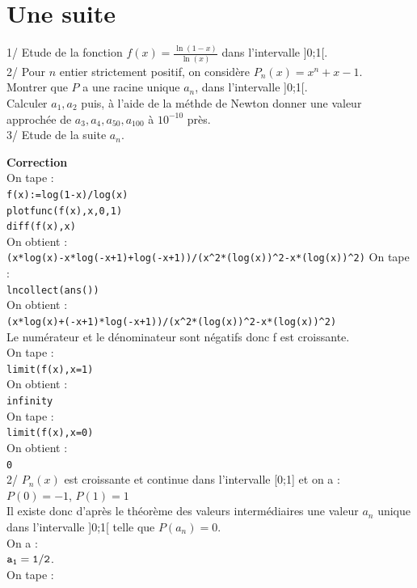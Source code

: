 \documentclass[a4paper,11pt]{book}
\begin{document}
\section{Une suite}
1/ Etude de la fonction $f(x)=\displaystyle \frac{\ln(1-x)}{\ln(x)}$ dans 
l'intervalle ]0;1[.\\
2/ Pour $n$ entier strictement positif, on consid\`ere $P_n(x)=x^n+x-1$.\\
Montrer que $P$ a une racine unique $a_n$, dans l'intervalle ]0;1[.\\
Calculer $a_1,a_2$ puis, \`a l'aide de la m\'ethde de Newton donner une valeur
approch\'ee de $a_3,a_4,a_{50},a_{100}$ \`a $10^{-10}$  pr\`es.\\
3/ Etude de la suite $a_n$.

{\bf Correction}\\
On tape :\\
{\tt f(x):=log(1-x)/log(x)}\\
{\tt plotfunc(f(x),x,0,1)}\\
{\tt diff(f(x),x)}\\
On obtient :\\
{\tt (x*log(x)-x*log(-x+1)+log(-x+1))/(x\verb|^|2*(log(x))\verb|^|2-x*(log(x))\verb|^|2)} 
On tape :\\
{\tt lncollect(ans())}\\
On obtient :\\
{\tt (x*log(x)+(-x+1)*log(-x+1))/(x\verb|^|2*(log(x))\verb|^|2-x*(log(x))\verb|^|2)}\\
Le num\'erateur et le d\'enominateur sont n\'egatifs donc f est croissante.\\
On tape :\\
{\tt limit(f(x),x=1)}\\
On obtient :\\
{\tt infinity}\\
On tape :\\
{\tt limit(f(x),x=0)}\\
On obtient :\\
{\tt 0}\\
2/ $P_n(x)$ est croissante et continue dans l'intervalle [0;1] et on a :\\
$P(0)=-1$,  $P(1)=1$\\
Il existe donc d'apr\`es le th\'eor\`eme des valeurs interm\'ediaires une 
valeur $a_n$ unique dans l'intervalle ]0;1[ telle que $P(a_n)=0$.\\ 
On a :\\
${\tt a_1=1/2}$.\\
On tape :\\
\end{document}

